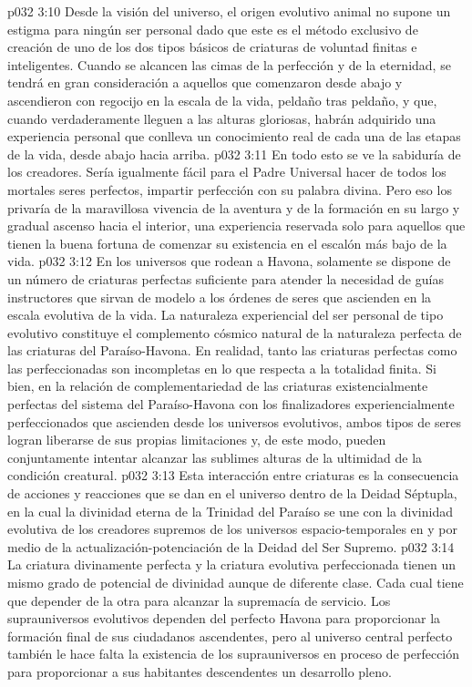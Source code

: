 \vs p032 3:10 Desde la visión del universo, el origen evolutivo animal no supone un estigma para ningún ser personal dado que este es el método exclusivo de creación de uno de los dos tipos básicos de criaturas de voluntad finitas e inteligentes. Cuando se alcancen las cimas de la perfección y de la eternidad, se tendrá en gran consideración a aquellos que comenzaron desde abajo y ascendieron con regocijo en la escala de la vida, peldaño tras peldaño, y que, cuando verdaderamente lleguen a las alturas gloriosas, habrán adquirido una experiencia personal que conlleva un conocimiento real de cada una de las etapas de la vida, desde abajo hacia arriba.
\vs p032 3:11 En todo esto se ve la sabiduría de los creadores. Sería igualmente fácil para el Padre Universal hacer de todos los mortales seres perfectos, impartir perfección con su palabra divina. Pero eso los privaría de la maravillosa vivencia de la aventura y de la formación en su largo y gradual ascenso hacia el interior, una experiencia reservada solo para aquellos que tienen la buena fortuna de comenzar su existencia en el escalón más bajo de la vida.
\vs p032 3:12 En los universos que rodean a Havona, solamente se dispone de un número de criaturas perfectas suficiente para atender la necesidad de guías instructores que sirvan de modelo a los órdenes de seres que ascienden en la escala evolutiva de la vida. La naturaleza experiencial del ser personal de tipo evolutivo constituye el complemento cósmico natural de la naturaleza perfecta de las criaturas del Paraíso\hyp{}Havona. En realidad, tanto las criaturas perfectas como las perfeccionadas son incompletas en lo que respecta a la totalidad finita. Si bien, en la relación de complementariedad de las criaturas existencialmente perfectas del sistema del Paraíso\hyp{}Havona con los finalizadores experiencialmente perfeccionados que ascienden desde los universos evolutivos, ambos tipos de seres logran liberarse de sus propias limitaciones y, de este modo, pueden conjuntamente intentar alcanzar las sublimes alturas de la ultimidad de la condición creatural.
\vs p032 3:13 Esta interacción entre criaturas es la consecuencia de acciones y reacciones que se dan en el universo dentro de la Deidad Séptupla, en la cual la divinidad eterna de la Trinidad del Paraíso se une con la divinidad evolutiva de los creadores supremos de los universos espacio\hyp{}temporales en y por medio de la actualización\hyp{}potenciación de la Deidad del Ser Supremo.
\vs p032 3:14 La criatura divinamente perfecta y la criatura evolutiva perfeccionada tienen un mismo grado de potencial de divinidad aunque de diferente clase. Cada cual tiene que depender de la otra para alcanzar la supremacía de servicio. Los suprauniversos evolutivos dependen del perfecto Havona para proporcionar la formación final de sus ciudadanos ascendentes, pero al universo central perfecto también le hace falta la existencia de los suprauniversos en proceso de perfección para proporcionar a sus habitantes descendentes un desarrollo pleno.
